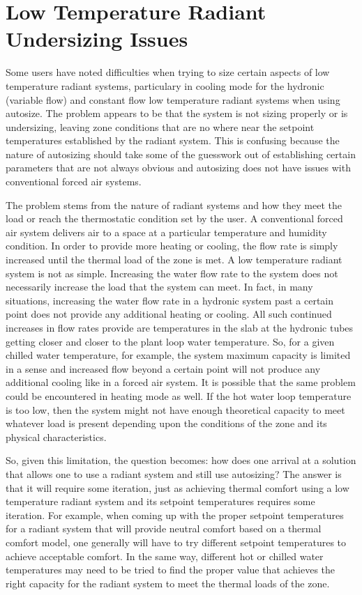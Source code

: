 \section{Low Temperature Radiant Undersizing Issues}\label{low-temperature-radiant-undersizing-issues}

Some users have noted difficulties when trying to size certain aspects of low temperature radiant systems, particulary in cooling mode for the hydronic (variable flow) and constant flow low temperature radiant systems when using autosize.  The problem appears to be that the system is not sizing properly or is undersizing, leaving zone conditions that are no where near the setpoint temperatures established by the radiant system.  This is confusing because the nature of autosizing should take some of the guesswork out of establishing certain parameters that are not always obvious and autosizing does not have issues with conventional forced air systems.

The problem stems from the nature of radiant systems and how they meet the load or reach the thermostatic condition set by the user.  A conventional forced air system delivers air to a space at a particular temperature and humidity condition.  In order to provide more heating or cooling, the flow rate is simply increased until the thermal load of the zone is met.  A low temperature radiant system is not as simple.  Increasing the water flow rate to the system does not necessarily increase the load that the system can meet.  In fact, in many situations, increasing the water flow rate in a hydronic system past a certain point does not provide any additional heating or cooling.  All such continued increases in flow rates provide are temperatures in the slab at the hydronic tubes getting closer and closer to the plant loop water temperature.  So, for a given chilled water temperature, for example, the system maximum capacity is limited in a sense and increased flow beyond a certain point will not produce any additional cooling like in a forced air system.  It is possible that the same problem could be encountered in heating mode as well.  If the hot water loop temperature is too low, then the system might not have enough theoretical capacity to meet whatever load is present depending upon the conditions of the zone and its physical characteristics.

So, given this limitation, the question becomes: how does one arrival at a solution that allows one to use a radiant system and still use autosizing?  The answer is that it will require some iteration, just as achieving thermal comfort using a low temperature radiant system and its setpoint temperatures requires some iteration.  For example, when coming up with the proper setpoint temperatures for a radiant system that will provide neutral comfort based on a thermal comfort model, one generally will have to try different setpoint temperatures to achieve acceptable comfort.  In the same way, different hot or chilled water temperatures may need to be tried to find the proper value that achieves the right capacity for the radiant system to meet the thermal loads of the zone.


